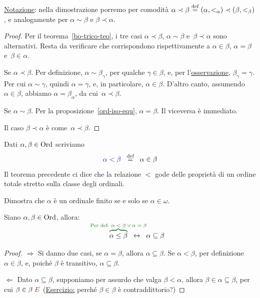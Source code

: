{\drkgrn \underline{Notazione}: nella dimostrazione porremo per comodit\`a
$\alpha \prec \beta \overset{\text{def}}{=} (\alpha,<_\alpha) \prec (\beta,<_\beta)$, e
analogamente per $\alpha \sim \beta$ e $\beta \prec \alpha$.}

\begin{proof}
Per il teorema~\ref{bo-trico-teo}, i tre casi $\alpha\prec\beta$,
$\alpha\sim\beta$ e~$\beta\prec\alpha$ sono alternativi. Resta da
verificare che corrispondono rispettivamente a $\alpha\in\beta$,
$\alpha=\beta$ e~$\beta\in\alpha$.

{\drkblu Se $\alpha \prec \beta$.} Per definizione, $\alpha \sim \beta_\gamma$, per qualche $\gamma \in \beta$, e, per l'\hyperref[Ord_trans]{osservazione}, $\beta_\gamma = \gamma$.
		Per cui $\alpha \sim \gamma$, quindi $\alpha = \gamma$, e,
in particolare, $\alpha \in \beta$. D'altro canto, assumendo
$\alpha\in\beta$, abbiamo $\alpha=\beta_\alpha$, da cui~$\alpha \prec
\beta$.

{\drkblu Se $\alpha \sim \beta$.} Per la proposizione~\ref{ord-iso-equ},
$\alpha = \beta$. Il viceversa \`e immediato.

{\drkblu Il caso $\beta\prec\alpha$} \`e come~$\alpha\prec\beta$.
\end{proof}

\begin{notation}
	Dati $\alpha,\beta \in \operatorname{Ord}$ scriviamo
	\[ {\drkblu \alpha < \beta} \;\;\Mydef\;\; \alpha \in \beta
		\]
	{\drkgrn Il teorema precedente ci dice che la relazione $<$ gode
delle propriet\`a di un ordine totale stretto sulla classe degli
ordinali.}
\end{notation}

\begin{exercise}
	Dimostra che $\alpha$ \`e un ordinale finito se e solo se $\alpha \in \omega$.
\end{exercise}

\begin{proposition}\label{or-le-su}
	Siano $\alpha,\beta \in \operatorname{Ord}$, allora:
	\[ {\drkgrn\qquad\overbrace{\color{black}\alpha \leq \beta}^{\smash{\mathclap{\text{\drkgrn Per def.\
$\alpha<\beta \lor \alpha=\beta$}}}}} \;\;\leftrightarrow\;\; \alpha \subseteq \beta
		\]
\end{proposition}

\begin{proof}
	{\drkblu $\Longrightarrow$} Si danno due casi, se $\alpha =
\beta$, allora $\alpha\subseteq\beta$. Se $\alpha < \beta$, per definizione $\alpha \in \beta$,
		e, poich\'e $\beta$ \`e transitivo, $\alpha \subseteq \beta$.

{\drkblu $\Longleftarrow$} Dato $\alpha \subseteq \beta$, supponiamo per
assurdo che valga $\beta < \alpha$, allora $\beta \in \alpha \subseteq
\beta$, per cui $\beta \in \beta \;{\drkred\lightning}$
(\underline{Esercizio:} perch\'e $\beta\in\beta$ \`e contraddittorio?)
\end{proof}

